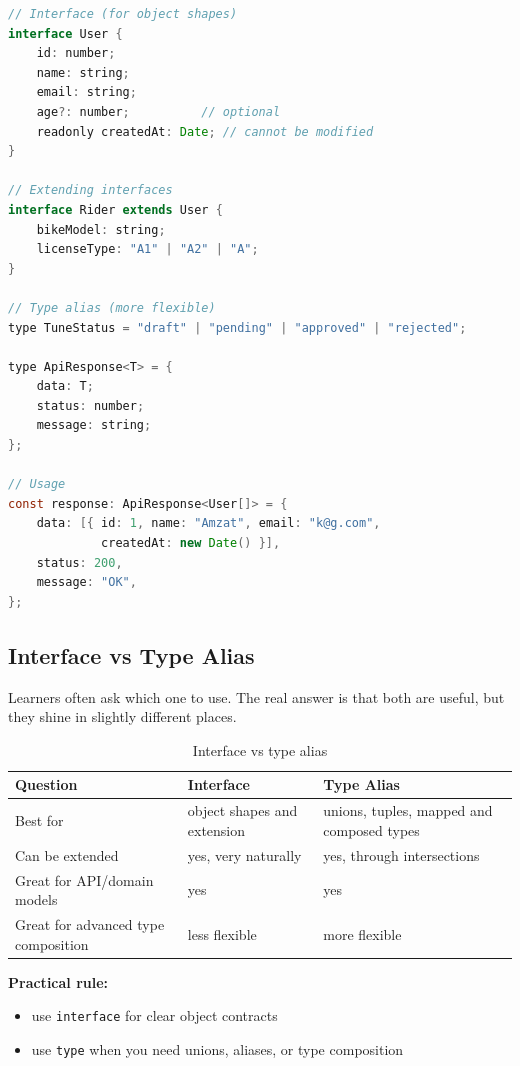 \documentclass[12pt, a4paper, oneside]{book}
\begin{document}
\begin{lstlisting}[language=Java, caption={Interfaces and types}]
// Interface (for object shapes)
interface User {
    id: number;
    name: string;
    email: string;
    age?: number;          // optional
    readonly createdAt: Date; // cannot be modified
}

// Extending interfaces
interface Rider extends User {
    bikeModel: string;
    licenseType: "A1" | "A2" | "A";
}

// Type alias (more flexible)
type TuneStatus = "draft" | "pending" | "approved" | "rejected";

type ApiResponse<T> = {
    data: T;
    status: number;
    message: string;
};

// Usage
const response: ApiResponse<User[]> = {
    data: [{ id: 1, name: "Amzat", email: "k@g.com",
             createdAt: new Date() }],
    status: 200,
    message: "OK",
};
\end{lstlisting}

\subsection{Interface vs Type Alias}

Learners often ask which one to use. The real answer is that both are useful, but they shine in slightly different places.

\begin{table}[H]
\centering
\begin{tabular}{|p{}|p{}|p{}|}
\hline
\textbf{Question} & \textbf{Interface} & \textbf{Type Alias} \\
\hline
Best for & object shapes and extension & unions, tuples, mapped and composed types \\
\hline
Can be extended & yes, very naturally & yes, through intersections \\
\hline
Great for API/domain models & yes & yes \\
\hline
Great for advanced type composition & less flexible & more flexible \\
\hline
\end{tabular}
\caption{Interface vs type alias}
\end{table}

\textbf{Practical rule:}
\begin{itemize}[leftmargin=2em]
    \item use \texttt{interface} for clear object contracts
    \item use \texttt{type} when you need unions, aliases, or type composition
\end{itemize}
\end{document}
